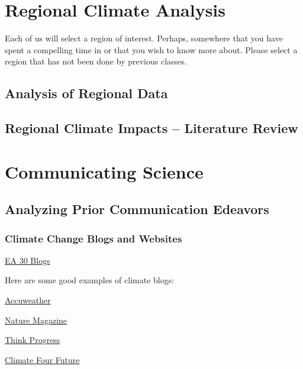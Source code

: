 \documentclass{article}\usepackage[]{graphicx}\usepackage[]{color}
\newenvironment{itemize*}%
  {\begin{itemize}%
    \setlength{\itemsep}{0pt}%
    \setlength{\parskip}{0pt}}%
  {\end{itemize}}
\begin{document}
\section{Regional Climate Analysis}

Each of us will select a region of interest. Perhaps, somewhere that you have spent a compelling time in or that you wish to know more about. Please select a region that has not been done by previous classes. 

\subsection{Analysis of Regional Data}



\subsection{Regional Climate Impacts -- Literature Review}



\section{Communicating Science}

\subsection{Analyzing Prior Communication Edeavors}

\subsubsection{Climate Change Blogs and Websites}

\href{https://marclos.github.io/Climate_Change_Narratives/}{EA 30 Blogs}

Here are some good examples of climate blogs:

\begin{itemize*}
  \item \href{http://www.accuweather.com/en/weather-blogs/climatechange}{Accuweather}
  \item \href{http://blogs.nature.com/climatefeedback/}{Nature Magazine}
  \item \href{https://thinkprogress.org/tagged/climate}{Think Progress}
  \item \href{http://climateofourfuture.org/}{Climate Four Future}
\end{itemize*}
\end{document}

